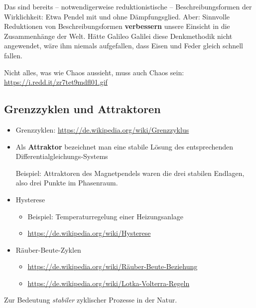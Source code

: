 \documentclass[11pt,a4paper]{article}
\begin{document}
Das sind bereits -- notwendigerweise reduktionistische -- Beschreibungsformen
der Wirklichkeit: Etwa Pendel mit und ohne Dämpfungsglied.  Aber: Sinnvolle
Reduktionen von Beschreibungsformen \textbf{verbessern} unsere Einsicht in die
Zusammenhänge der Welt.  Hätte Galileo Galilei diese Denkmethodik nicht
angewendet, wäre ihm niemals aufgefallen, dass Eisen und Feder gleich schnell
fallen.

Nicht alles, was wie Chaos aussieht, muss auch Chaos sein:\\
\url{https://i.redd.it/zr7tet9mdfl01.gif} 

\subsection{Grenzzyklen und Attraktoren}

\begin{itemize}
\item Grenzzyklen: \url{https://de.wikipedia.org/wiki/Grenzzyklus}
\item Als \textbf{Attraktor} bezeichnet man eine stabile Lösung des
  entsprechenden Differentialglei\-chungs-Systems

  Beispiel: Attraktoren des Magnetpendels waren die drei stabilen Endlagen,
  also drei Punkte im Phasenraum.

\item Hysterese
\begin{itemize}
  \item Beispiel: Temperaturregelung einer Heizungsanlage
  \item \url{https://de.wikipedia.org/wiki/Hysterese}
\end{itemize}
\item Räuber-Beute-Zyklen
\begin{itemize}
  \item \url{https://de.wikipedia.org/wiki/Räuber-Beute-Beziehung}
  \item \url{https://de.wikipedia.org/wiki/Lotka-Volterra-Regeln}
\end{itemize}
\end{itemize}

Zur Bedeutung \emph{stabiler} zyklischer Prozesse in der Natur. 
\end{document}
